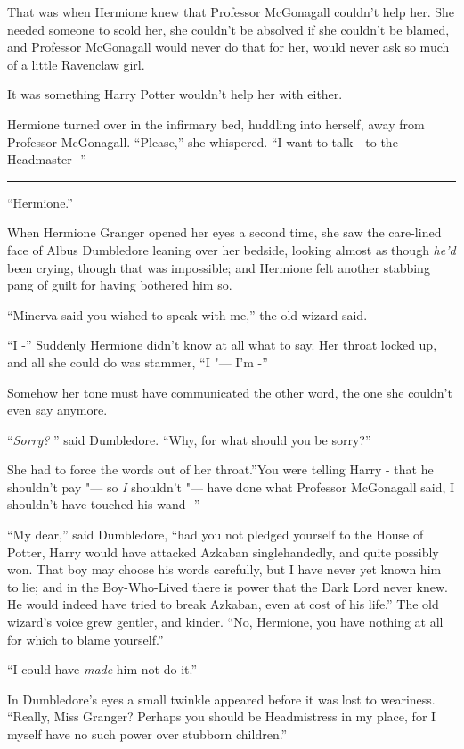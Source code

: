 That was when Hermione knew that Professor McGonagall couldn't help her.
She needed someone to scold her, she couldn't be absolved if she
couldn't be blamed, and Professor McGonagall would never do that for
her, would never ask so much of a little Ravenclaw girl.

It was something Harry Potter wouldn't help her with either.

Hermione turned over in the infirmary bed, huddling into herself, away
from Professor McGonagall. ``Please,'' she whispered. ``I want to talk -
to the Headmaster -''

\begin{center}\rule{3in}{0.4pt}\end{center}

``Hermione.''

When Hermione Granger opened her eyes a second time, she saw the
care-lined face of Albus Dumbledore leaning over her bedside, looking
almost as though \emph{he'd} been crying, though that was impossible;
and Hermione felt another stabbing pang of guilt for having bothered him
so.

``Minerva said you wished to speak with me,'' the old wizard said.

``I -'' Suddenly Hermione didn't know at all what to say. Her throat
locked up, and all she could do was stammer, ``I "--- I'm -''

Somehow her tone must have communicated the other word, the one she
couldn't even say anymore.

``\emph{Sorry?} '' said Dumbledore. ``Why, for what should you be sorry?''

She had to force the words out of her throat.''You were telling Harry -
that he shouldn't pay "--- so \emph{I} shouldn't "--- have done what Professor
McGonagall said, I shouldn't have touched his wand -''

``My dear,'' said Dumbledore, ``had you not pledged yourself to the
House of Potter, Harry would have attacked Azkaban singlehandedly, and
quite possibly won. That boy may choose his words carefully, but I have
never yet known him to lie; and in the Boy-Who-Lived there is power that
the Dark Lord never knew. He would indeed have tried to break Azkaban,
even at cost of his life.'' The old wizard's voice grew gentler, and
kinder. ``No, Hermione, you have nothing at all for which to blame
yourself.''

``I could have \emph{made} him not do it.''

In Dumbledore's eyes a small twinkle appeared before it was lost to
weariness. ``Really, Miss Granger? Perhaps you should be Headmistress in
my place, for I myself have no such power over stubborn children.''

